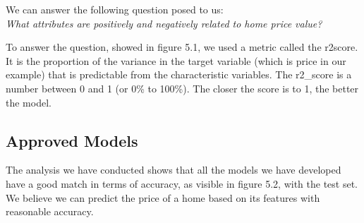We can answer the following question posed to us:
\\
\emph{What attributes are positively and negatively related to home price value?}

To answer the question, showed in figure 5.1, we used a metric called the r2\-score. It is the proportion of the variance in the target variable (which is price in our example) that is predictable from the characteristic variables. The r2\_score is a number between 0 and 1 (or 0\% to 100\%). The closer the score is to 1, the better the model.

\subsection{Approved Models}

The analysis we have conducted shows that all the models we have developed have a good match in terms of accuracy, as visible in figure 5.2, with the test set. We believe we can predict the price of a home based on its features with reasonable accuracy.

